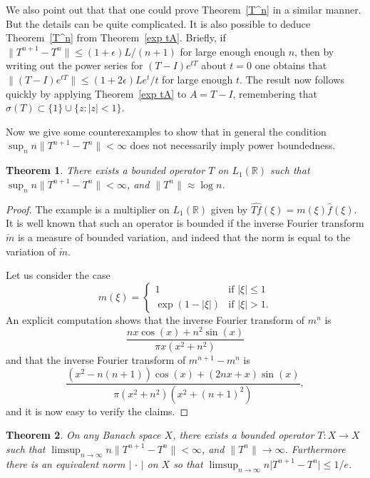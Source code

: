 \documentclass[12pt]{amsart}
\newtheorem{thm}{Theorem}[section]
\newcommand{\R}{{\mathbb R}}
\newcommand{\modo}[1]{{\left|#1\right|}}
\newcommand{\smodo}[1]{{\mathopen|#1\mathclose|}}
\newcommand{\snormo}[1]{{\mathopen\|#1\mathclose\|}}
\begin{document}
We also point out that that one could prove Theorem~\ref{T^n} in a similar
manner.  But the details can be quite complicated.  It is also possible
to deduce Theorem~\ref{T^n} from Theorem~\ref{exp tA}.  Briefly,
if $\snormo{T^{n+1}-T^n} \le (1+\epsilon)L/(n+1)$ for large enough enough $n$,
then by writing out the power series for $(T-I)e^{tT}$ about $t=0$
one obtains that
$\snormo{(T-I)e^{tT}} \le (1+2\epsilon)Le^t/t$ for large enough $t$.
The result now follows quickly by applying Theorem~\ref{exp tA} to $A = T-I$,
remembering that $\sigma(T) \subset \{1\} \cup \{z:\modo z < 1\}$.

Now we give some counterexamples to show that in general the condition
$\sup_n n\snormo{T^{n+1}-T^n} < \infty $ does not necessarily imply
power boundedness.

\begin{thm}
There exists a bounded operator $T$ on $L_1(\R)$ such that
$ \sup_n n\snormo{T^{n+1}-T^n} < \infty $,
and $\snormo{T^n} \approx \log n$.
\end{thm}

\begin{proof}
The example is a multiplier on $L_1(\R)$ given by
$\widehat{Tf}(\xi) = m(\xi) \hat f(\xi)$.
It is well known that such an operator is bounded if the inverse
Fourier transform
$\check m$ is a measure of bounded variation, and indeed that the norm
is equal to the variation of $\check m$.

Let us consider the case
$$ m(\xi) = \left\{
   \begin{array}{cl}
     1 & \text{if $\modo\xi \le 1$}\\
     \exp(1-\modo{\xi}) & \text{if $\modo\xi > 1$}.
   \end{array} \right.
$$
An explicit computation
shows that the inverse Fourier transform of $m^n$ is
$$ \frac{n x\cos(x)+n^2\sin(x)}{\pi x(x^2+n^2)} $$
and that the inverse Fourier transform of $m^{n+1}-m^n$ is
$$ \frac
   {(x^2-n(n+1))\cos(x) + (2n x+x)\sin(x)}
   {\pi (x^2+n^2)(x^2+(n+1)^2)} ,$$
and it is now easy to verify the claims.
\end{proof}

\begin{thm}
On any Banach space $X$, there exists a bounded operator $T:X\to X$
such that
$ \limsup_{n\to\infty} n\snormo{T^{n+1}-T^n} < \infty $,
and $\snormo{T^n} \to \infty$.  Furthermore there is an equivalent
norm $\modo{\,\cdot\,}$ on $X$ so that
$ \limsup_{n\to\infty} n\smodo{T^{n+1}-T^n} \le 1/e $.
\end{thm}
\end{document}
